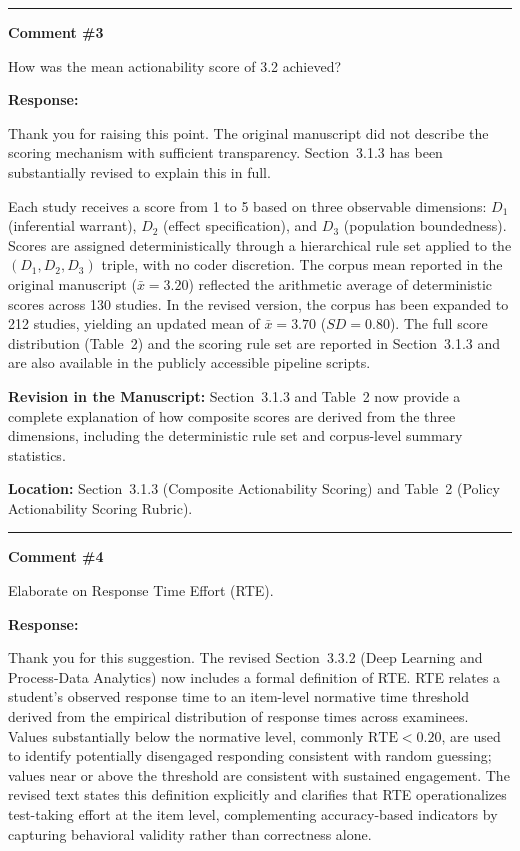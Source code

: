 \documentclass[12pt, a4paper]{article}
\begin{document}
\bigskip\hrule\bigskip

\noindent\textbf{Comment \#3}

\medskip
\noindent\textcolor{reviewerblue}{%
How was the mean actionability score of 3.2 achieved?}

\medskip
\noindent\textbf{Response:}

Thank you for raising this point. The original manuscript did not describe the scoring mechanism
with sufficient transparency. Section~3.1.3 has been substantially revised to explain this in full.

Each study receives a score from 1 to 5 based on three observable dimensions: $D_1$ (inferential
warrant), $D_2$ (effect specification), and $D_3$ (population boundedness). Scores are assigned
deterministically through a hierarchical rule set applied to the $(D_1, D_2, D_3)$ triple, with
no coder discretion. The corpus mean reported in the original manuscript ($\bar{x}=3.20$) reflected
the arithmetic average of deterministic scores across 130 studies. In the revised version, the
corpus has been expanded to 212 studies, yielding an updated mean of $\bar{x}=3.70$ ($SD=0.80$).
The full score distribution (Table~2) and the scoring rule set are reported in Section~3.1.3 and
are also available in the publicly accessible pipeline scripts.

\medskip
\noindent\textbf{Revision in the Manuscript:}
Section~3.1.3 and Table~2 now provide a complete explanation of how composite scores are derived
from the three dimensions, including the deterministic rule set and corpus-level summary statistics.

\medskip
\noindent\textbf{Location:} Section~3.1.3 (Composite Actionability Scoring) and Table~2 (Policy
Actionability Scoring Rubric).

\bigskip\hrule\bigskip

\noindent\textbf{Comment \#4}

\medskip
\noindent\textcolor{reviewerblue}{%
Elaborate on Response Time Effort (RTE).}

\medskip
\noindent\textbf{Response:}

Thank you for this suggestion. The revised Section~3.3.2 (Deep Learning and Process-Data Analytics)
now includes a formal definition of RTE. RTE relates a student's observed response time to an
item-level normative time threshold derived from the empirical distribution of response times across
examinees. Values substantially below the normative level, commonly $\text{RTE}<0.20$, are used to
identify potentially disengaged responding consistent with random guessing; values near or above the
threshold are consistent with sustained engagement. The revised text states this definition explicitly
and clarifies that RTE operationalizes test-taking effort at the item level, complementing
accuracy-based indicators by capturing behavioral validity rather than correctness alone.
\end{document}
